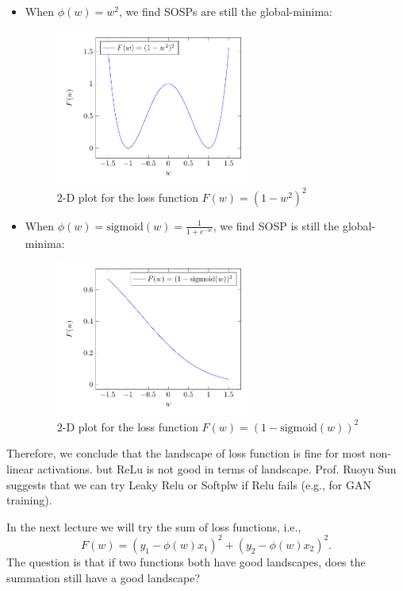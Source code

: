 \begin{itemize}
\item
When $\phi(w)=w^2$, we find SOSPs are still the global-minima:
\begin{figure}[H]
\centering
\includegraphics[width=0.6\textwidth]{Fifth_lecture/f_4.pdf}
\caption{$2$-D plot for the loss function $F(w) = (1-w^2)^2$}
\label{fig:5:4}
\end{figure}
\item
When $\phi(w)=\text{sigmoid}(w)=\frac{1}{1+e^{-w}}$, we find SOSP is still the global-minima:
\begin{figure}[H]
\centering
\includegraphics[width=0.6\textwidth]{Fifth_lecture/f_5.pdf}
\caption{$2$-D plot for the loss function $F(w) = (1-\text{sigmoid}(w))^2$}
\label{fig:5:5}
\end{figure}
\end{itemize}
Therefore, we conclude that the landscape of loss function is fine for most non-linear activations.
but ReLu is not good in terms of landscape.
Prof. Ruoyu Sun suggests that we can try Leaky Relu or Softplw if Relu fails (e.g., for GAN training).

In the next lecture we will try the sum of loss functions, i.e., 
\[
F(w) = (y_1-\phi(w)x_1)^2+(y_2-\phi(w)x_2)^2.
\]
The question is that if two functions both have good landscapes, does the summation still have a good landscape?




